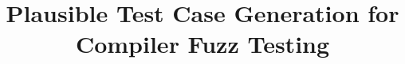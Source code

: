 



\title{Plausible Test Case Generation for Compiler Fuzz Testing}
\maketitle













\printbibliography

